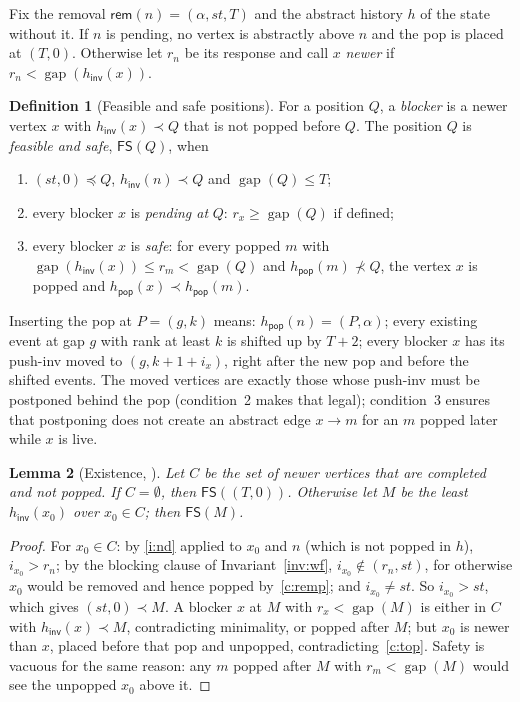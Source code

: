 \documentclass[11pt]{article}
\newtheorem{lemma}{Lemma}[section]
\theoremstyle{definition}
\newtheorem{definition}[lemma]{Definition}
\theoremstyle{remark}
\newcommand{\gap}{\mathop{\mathrm{gap}}}
\newcommand{\code}[1]{\texttt{\detokenize{#1}}}
\newcommand{\FS}{\mathsf{FS}}
\newcommand{\rem}{\mathsf{rem}}
\newcommand{\lt}{\prec}
\newcommand{\lte}{\preceq}
\newcommand{\pop}{\mathsf{pop}}
\newcommand{\inv}{\mathsf{inv}}
\begin{document}
Fix the removal \(\rem(n)=(\alpha,st,T)\) and the abstract history \(h\) of
the state without it.  If \(n\) is pending, no vertex is abstractly above
\(n\) and the pop is placed at \((T,0)\).  Otherwise let \(r_n\) be its
response and call \(x\) \emph{newer} if \(r_n<\gap(h_\inv(x))\).

\begin{definition}[Feasible and safe positions]
For a position \(Q\), a \emph{blocker} is a newer vertex \(x\) with
\(h_\inv(x)\lt Q\) that is not popped before \(Q\).  The position \(Q\) is
\emph{feasible and safe}, \(\FS(Q)\), when
\begin{enumerate}[nosep]
\item \((st,0)\lte Q\), \(h_\inv(n)\lt Q\) and \(\gap(Q)\le T\);
\item every blocker \(x\) is \emph{pending at} \(Q\): \(r_x\ge\gap(Q)\) if
  defined;
\item every blocker \(x\) is \emph{safe}: for every popped \(m\) with
  \(\gap(h_\inv(x))\le r_m<\gap(Q)\) and \(h_\pop(m)\not\lt Q\), the vertex
  \(x\) is popped and \(h_\pop(x)\lt h_\pop(m)\).
\end{enumerate}
\end{definition}

Inserting the pop at \(P=(g,k)\) means: \(h_\pop(n)=(P,\alpha)\); every
existing event at gap \(g\) with rank at least \(k\) is shifted up by
\(T+2\); every blocker \(x\) has its push-inv moved to \((g,k+1+i_x)\),
right after the new pop and before the shifted events.  The moved vertices
are exactly those whose push-inv must be postponed behind the pop
(condition~2 makes that legal); condition~3 ensures that postponing does not
create an abstract edge \(x\to m\) for an \(m\) popped later while \(x\)
is live.

\begin{lemma}[Existence, \code{exists_M}]\label{lem:M}
Let \(C\) be the set of newer vertices that are completed and not popped.
If \(C=\emptyset\), then \(\FS((T,0))\).  Otherwise let \(M\) be the least
\(h_\inv(x_0)\) over \(x_0\in C\); then \(\FS(M)\).
\end{lemma}

\begin{proof}
For \(x_0\in C\): by \ref{i:nd} applied to \(x_0\) and \(n\) (which is not
popped in \(h\)), \(i_{x_0}>r_n\); by the blocking clause of
Invariant~\ref{inv:wf}, \(i_{x_0}\notin(r_n,st)\), for otherwise \(x_0\)
would be removed and hence popped by~\ref{c:remp}; and \(i_{x_0}\ne st\).
So \(i_{x_0}>st\), which gives \((st,0)\lt M\).  A blocker \(x\) at \(M\)
with \(r_x<\gap(M)\) is either in \(C\) with \(h_\inv(x)\lt M\), contradicting
minimality, or popped after \(M\); but \(x_0\) is newer than \(x\), placed
before that pop and unpopped, contradicting~\ref{c:top}.  Safety is
vacuous for the same reason: any \(m\) popped after \(M\) with
\(r_m<\gap(M)\) would see the unpopped \(x_0\) above it.
\end{proof}
\end{document}
